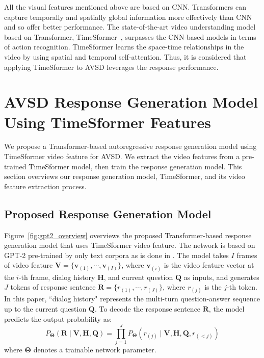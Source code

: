 \documentclass[letterpaper]{article} %
\begin{document}
All the visual features mentioned above are based on CNN.
Transformers can capture temporally and spatially global information more effectively than CNN and so offer better performance.
The state-of-the-art video understanding model based on Transformer, TimeSformer~\cite{Bertasius2021is}, surpasses the CNN-based models in terms of action recognition.
TimeSformer learns the space-time relationships in the video by using spatial and temporal self-attention.
Thus, it is considered that applying TimeSformer to AVSD leverages the response performance.


\section{AVSD Response Generation Model Using TimeSformer Features}
We propose a Transformer-based autoregressive response generation model using TimeSformer video feature for AVSD.
We extract the video features from a pre-trained TimeSformer model, then train the response generation model.
This section overviews our response generation model, TimeSformer, and its video feature extraction process.

\subsection{Proposed Response Generation Model}
Figure~\ref{fig:gpt2_overview} overviews the proposed Transformer-based response generation model that uses TimeSformer video feature.
The network is based on GPT-2 pre-trained by only text corpora as is done in \citet{Li2021bridging}.
The model takes $I$ frames of video feature $\bm{V} = \{\bm{v}_{(1)}, \cdots , \bm{v}_{(I)}\}$, where $\bm{v}_{(i)}$ is the video feature vector at the $i$-th frame, dialog history $\bm{H}$, and current question $\bm{Q}$ as inputs, and generates $J$ tokens of response sentence $\bm{R} = \{r_{(1)}, \cdots , r_{(J)}\}$, where $r_{(j)}$ is the $j$-th token.
In this paper, ``dialog history" represents the multi-turn question-answer sequence up to the current question $\bm{Q}$.
To decode the response sentence $\bm{R}$, the model predicts the output probability as:
\begin{equation}
  P_{\bm{\Theta}}(\bm{R} \mid \bm{V}, \bm{H}, \bm{Q}) = \prod^{J}_{j=1}P_{\bm{\Theta}}(r_{(j)} \mid \bm{V}, \bm{H}, \bm{Q}, r_{(<j)})
\end{equation}
where $\bm{\Theta}$ denotes a trainable network parameter.
\end{document}
